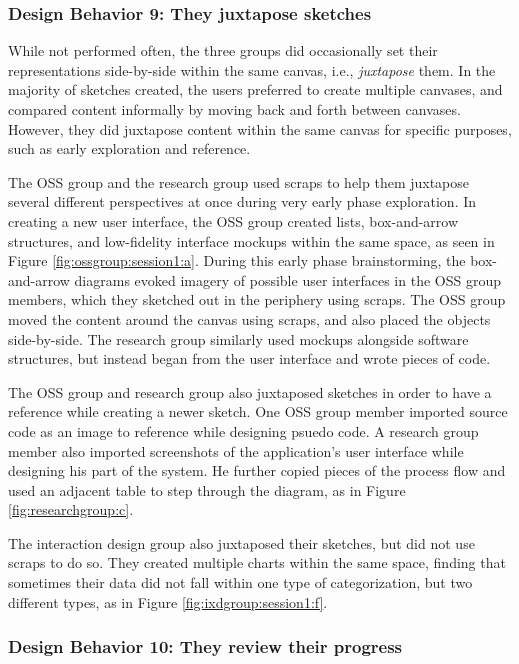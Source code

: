\subsubsection{Design Behavior 9: They juxtapose sketches}

While not performed often, the three groups did occasionally set their representations side-by-side within the same canvas, i.e., \textit{juxtapose} them. In the majority of sketches created, the users preferred to create multiple canvases, and compared content informally by moving back and forth between canvases. However, they did juxtapose content within the same canvas for specific purposes, such as early exploration and reference.

The OSS group and the research group used scraps to help them juxtapose several different perspectives at once during very early phase exploration. In creating a new user interface, the OSS group created lists, box-and-arrow structures, and low-fidelity interface mockups within the same space, as seen in Figure \ref{fig:ossgroup:session1:a}. During this early phase brainstorming, the box-and-arrow diagrams evoked imagery of possible user interfaces in the OSS group members, which they sketched out in the periphery using scraps. The OSS group moved the content around the canvas using scraps, and also placed the objects side-by-side. The research group similarly used mockups alongside software structures, but instead began from the user interface and wrote pieces of code. 

The OSS group and research group also juxtaposed sketches in order to have a reference while creating a newer sketch. One OSS group member imported source code as an image to reference while designing psuedo code. A research group member also imported screenshots of the application's user interface while designing his part of the system. He further copied pieces of the process flow and used an adjacent table to step through the diagram, as in Figure \ref{fig:researchgroup:c}.

The interaction design group also juxtaposed their sketches, but did not use scraps to do so. They created multiple charts within the same space, finding that sometimes their data did not fall within one type of categorization, but two different types, as in Figure \ref{fig:ixdgroup:session1:f}. 

\subsubsection{Design Behavior 10: They review their progress}

